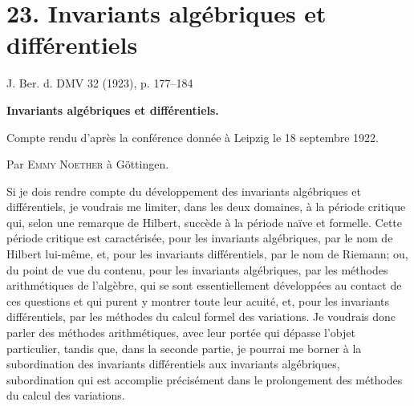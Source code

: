 \setcounter{footnote}{0}
\providecommand{\mJ}{\mathfrak{J}}
\providecommand{\mS}{\mathfrak{S}}
\providecommand{\mo}{\mathfrak{o}}
\providecommand{\ma}{\mathfrak{a}}
\providecommand{\mb}{\mathfrak{b}}
\providecommand{\dd}{\mathrm d}
\providecommand{\D}{}
\renewcommand{\D}{\Delta}
\providecommand{\dx}{\dd x}
\providecommand{\dy}{\dd y}

\section*{23. Invariants algébriques et différentiels}
\begin{center}
J. Ber. d. DMV 32 (1923), p. 177--184
\end{center}

\begin{center}
{\Large\bfseries Invariants algébriques et différentiels.}\par
\vspace{0.45em}
Compte rendu d'après la conférence donnée à Leipzig le 18 septembre 1922.\par
\vspace{1.0em}
Par \textsc{Emmy Noether} à Göttingen.
\end{center}

Si je dois rendre compte du développement des invariants algébriques et différentiels, je voudrais me limiter, dans les deux domaines, à la période critique qui, selon une remarque de Hilbert, succède à la période naïve et formelle. Cette période critique est caractérisée, pour les invariants algébriques, par le nom de Hilbert lui-même, et, pour les invariants différentiels, par le nom de Riemann; ou, du point de vue du contenu, pour les invariants algébriques, par les méthodes arithmétiques de l'algèbre, qui se sont essentiellement développées au contact de ces questions et qui purent y montrer toute leur acuité, et, pour les invariants différentiels, par les méthodes du calcul formel des variations. Je voudrais donc parler des méthodes arithmétiques, avec leur portée qui dépasse l'objet particulier, tandis que, dans la seconde partie, je pourrai me borner à la subordination des invariants différentiels aux invariants algébriques, subordination qui est accomplie précisément dans le prolongement des méthodes du calcul des variations.

